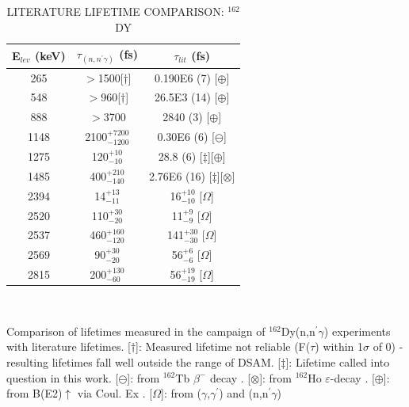 \begin{table}[h!]
\begin{center}
\caption{LITERATURE LIFETIME COMPARISON: $^{162}$DY \label{tab:lifetimes_comparison}}
\begin{tabular}{c|c|c}
E$_{lev}$ (keV) & $\tau_{(n,n^\prime\gamma)}$ (fs) & $\tau_{lit}$ (fs) \\
\hline
\hline
265  & $>$1500[$\dagger$]      & 0.190E6 (7) [$\oplus$] \\
548  & $>$960[$\dagger$]       & 26.5E3 (14) [$\oplus$] \\
888  & $>$3700                 & 2840 (3) [$\oplus$] \\
1148 & 2100$^{+7200}_{-1200}$  & 0.30E6 (6) [$\ominus$]\\
1275 & 120$^{+10}_{-10}$   & 28.8 (6) [$\ddagger$][$\oplus$]\\
1485 & 400$^{+210}_{-140}$ & 2.76E6 (16) [$\ddagger$][$\otimes$]\\
2394 & 14$^{+13}_{-11}$    & 16$^{+10}_{-10}$ [$\Omega$]\\
2520 & 110$^{+30}_{-20}$   & 11$^{+9}_{-9}$ [$\Omega$]\\
2537 & 460$^{+160}_{-120}$ & 141$^{+30}_{-30}$ [$\Omega$]\\
2569 & 90$^{+30}_{-20}$    & 56$^{+6}_{-6}$ [$\Omega$]\\
2815 & 200$^{+130}_{-60}$  & 56$^{+19}_{-19}$ [$\Omega$] \\
\end{tabular}\\ \vspace{10pt}
\end{center}
Comparison of lifetimes measured in the campaign of $^{162}$Dy(n,n$^\prime\gamma$) experiments with literature lifetimes.
[$\dagger$]: Measured lifetime not reliable (F($\tau$) within 1$\sigma$ of 0) - resulting lifetimes fall well outside the range of DSAM.
[$\ddagger$]: Lifetime called into question in this work. 
[$\ominus$]: from $^{162}$Tb $\beta^-$ decay \cite{PhysRev.166.1227}.
[$\otimes$]: from $^{162}$Ho $\varepsilon$-decay \cite{Honig_5minus1969}. 
[$\oplus$]: from B(E2)$\uparrow$ via Coul. Ex \cite{GROTDAL1968385}. 
[$\Omega$]: from ($\gamma$,$\gamma^\prime$) \cite{Margraf_gg'NRF_1995} and (n,n$^\prime\gamma$) \cite{Yates_162nnp1995}
\end{table}


